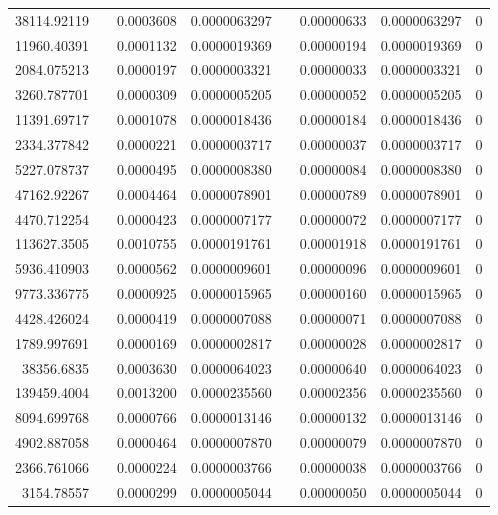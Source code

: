 \documentclass[
journal=jacsat, %
manuscript=article]{achemso}
\begin{document}
\begin{table}[htbp]
{\begin{tabular}{rrrrrrrr}
    38114.92119 &       & 0.0003608 & 0.0000063297 &       & 0.00000633 & 0.0000063297 & 0 \\
    11960.40391 &       & 0.0001132 & 0.0000019369 &       & 0.00000194 & 0.0000019369 & 0 \\
    2084.075213 &       & 0.0000197 & 0.0000003321 &       & 0.00000033 & 0.0000003321 & 0 \\
    3260.787701 &       & 0.0000309 & 0.0000005205 &       & 0.00000052 & 0.0000005205 & 0 \\
    11391.69717 &       & 0.0001078 & 0.0000018436 &       & 0.00000184 & 0.0000018436 & 0 \\
    2334.377842 &       & 0.0000221 & 0.0000003717 &       & 0.00000037 & 0.0000003717 & 0 \\
    5227.078737 &       & 0.0000495 & 0.0000008380 &       & 0.00000084 & 0.0000008380 & 0 \\
    47162.92267 &       & 0.0004464 & 0.0000078901 &       & 0.00000789 & 0.0000078901 & 0 \\
    4470.712254 &       & 0.0000423 & 0.0000007177 &       & 0.00000072 & 0.0000007177 & 0 \\
    113627.3505 &       & 0.0010755 & 0.0000191761 &       & 0.00001918 & 0.0000191761 & 0 \\
    5936.410903 &       & 0.0000562 & 0.0000009601 &       & 0.00000096 & 0.0000009601 & 0 \\
    9773.336775 &       & 0.0000925 & 0.0000015965 &       & 0.00000160 & 0.0000015965 & 0 \\
    4428.426024 &       & 0.0000419 & 0.0000007088 &       & 0.00000071 & 0.0000007088 & 0 \\
    1789.997691 &       & 0.0000169 & 0.0000002817 &       & 0.00000028 & 0.0000002817 & 0 \\
    38356.6835 &       & 0.0003630 & 0.0000064023 &       & 0.00000640 & 0.0000064023 & 0 \\
    139459.4004 &       & 0.0013200 & 0.0000235560 &       & 0.00002356 & 0.0000235560 & 0 \\
    8094.699768 &       & 0.0000766 & 0.0000013146 &       & 0.00000132 & 0.0000013146 & 0 \\
    4902.887058 &       & 0.0000464 & 0.0000007870 &       & 0.00000079 & 0.0000007870 & 0 \\
    2366.761066 &       & 0.0000224 & 0.0000003766 &       & 0.00000038 & 0.0000003766 & 0 \\
    3154.78557 &       & 0.0000299 & 0.0000005044 &       & 0.00000050 & 0.0000005044 & 0 \\

\end{tabular}}
\end{table}
\end{document}
